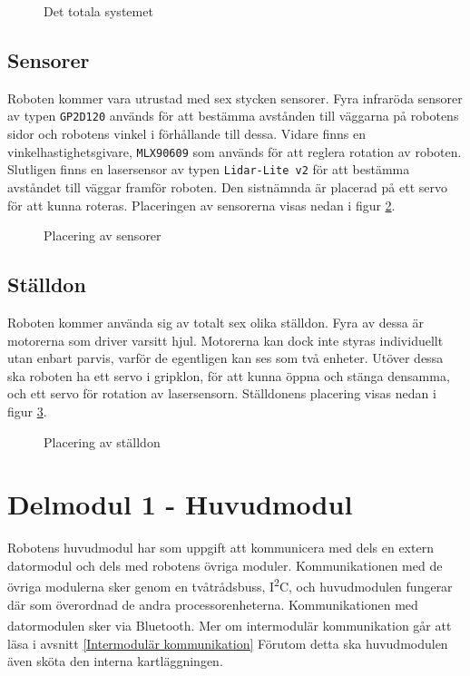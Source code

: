 \documentclass[11pt]{article}
\begin{document}
\begin{flushleft}
\begin{figure}[!htbp]
\centering
\noindent\resizebox{\linewidth}{!}{
	}
	\caption{Det totala systemet \label{overview}}	
\end{figure}

\FloatBarrier
\subsection{Sensorer}
Roboten kommer vara utrustad med sex stycken sensorer. Fyra infraröda sensorer av typen \verb+GP2D120+ används för att bestämma avstånden till väggarna på robotens sidor och robotens vinkel i förhållande till dessa. Vidare finns en vinkelhastighetsgivare, \verb+MLX90609+ som används för att reglera rotation av roboten. Slutligen finns en lasersensor av typen \verb+Lidar-Lite v2+ för att bestämma avståndet till väggar framför roboten. Den sistnämnda är placerad på ett servo för att kunna roteras. Placeringen av sensorerna visas nedan i figur \ref{sensor}.

\begin{figure}[htbp]
\centering
\noindent\resizebox{.8\linewidth}{!}{
	}
	\caption{Placering av sensorer \label{sensor}}	
\end{figure}

\subsection{Ställdon}
Roboten kommer använda sig av totalt sex olika ställdon. Fyra av dessa är motorerna som driver varsitt hjul. Motorerna kan dock inte styras individuellt utan enbart parvis, varför de egentligen kan ses som två enheter. Utöver dessa ska roboten ha ett servo i gripklon, för att kunna öppna och stänga densamma, och ett servo för rotation av lasersensorn. Ställdonens placering visas nedan i figur \ref{ställdon}.

\begin{figure}[htbp]
\centering
\noindent\resizebox{.8\linewidth}{!}{
	}
	\caption{Placering av ställdon \label{ställdon}}	
\end{figure}

\clearpage
\section{Delmodul 1 - Huvudmodul}
Robotens huvudmodul har som uppgift att kommunicera med dels en extern datormodul och dels med robotens övriga moduler. Kommunikationen med de övriga modulerna sker genom en tvåtrådsbuss, I\textsuperscript{2}C, och huvudmodulen fungerar där som överordnad de andra processorenheterna. Kommunikationen med datormodulen sker via  Bluetooth\textsuperscript{\circledR}. Mer om intermodulär kommunikation går att läsa i avsnitt \ref{Intermodulär kommunikation} Förutom detta ska huvudmodulen även sköta den interna kartläggningen. 


\end{flushleft}
\end{document}
